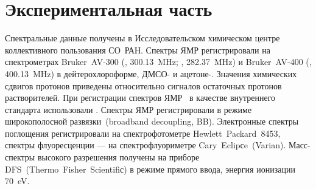 \section{Экспериментальная часть}

Спектральные данные получены в Исследовательском химическом центре коллективного пользования СО~РАН. Спектры ЯМР регистрировали на спектрометрах Bruker~AV-300 (, \SI{300.13}{\mega\hertz}; , \SI{282.37}{\mega\hertz}) и Bruker~AV-400 (, \SI{400.13}{\mega\hertz}) в дейтерохлороформе, ДМСО- и ацетоне-. Значения химических сдвигов протонов приведены относительно сигналов остаточных протонов растворителей. При регистрации спектров ЯМР~ в качестве внутреннего стандарта использовали . Спектры ЯМР  регистрировали в режиме широкополосной развязки~(broadband decoupling, BB). Электронные спектры поглощения регистрировали на спектрофотометре Hewlett~Packard~8453, спектры флуоресценции --- на спектрофлуориметре Cary~Eclipсe~(Varian). Масс-спектры высокого разрешения получены на приборе DFS~(Thermo~Fisher~Scientifiс) в режиме прямого ввода, энергия ионизации \SI{70}{\electronvolt}.

